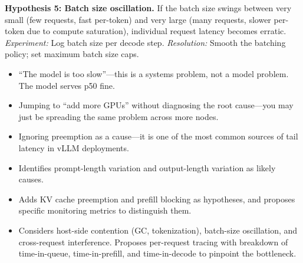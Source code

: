 \begin{interviewq}
\textbf{Hypothesis 5: Batch size oscillation.} If the batch size swings between very small (few requests, fast per-token) and very large (many requests, slower per-token due to compute saturation), individual request latency becomes erratic. \textit{Experiment:} Log batch size per decode step. \textit{Resolution:} Smooth the batching policy; set maximum batch size caps.

\redflags
\begin{itemize}
    \item ``The model is too slow''---this is a systems problem, not a model problem. The model serves p50 fine.
    \item Jumping to ``add more GPUs'' without diagnosing the root cause---you may just be spreading the same problem across more nodes.
    \item Ignoring preemption as a cause---it is one of the most common sources of tail latency in vLLM deployments.
\end{itemize}


\goodgreat
\begin{itemize}
    \item {} Identifies prompt-length variation and output-length variation as likely causes.
    \item {} Adds KV cache preemption and prefill blocking as hypotheses, and proposes specific monitoring metrics to distinguish them.
    \item {} Considers host-side contention (GC, tokenization), batch-size oscillation, and cross-request interference. Proposes per-request tracing with breakdown of time-in-queue, time-in-prefill, and time-in-decode to pinpoint the bottleneck.
\end{itemize}

\end{interviewq}


